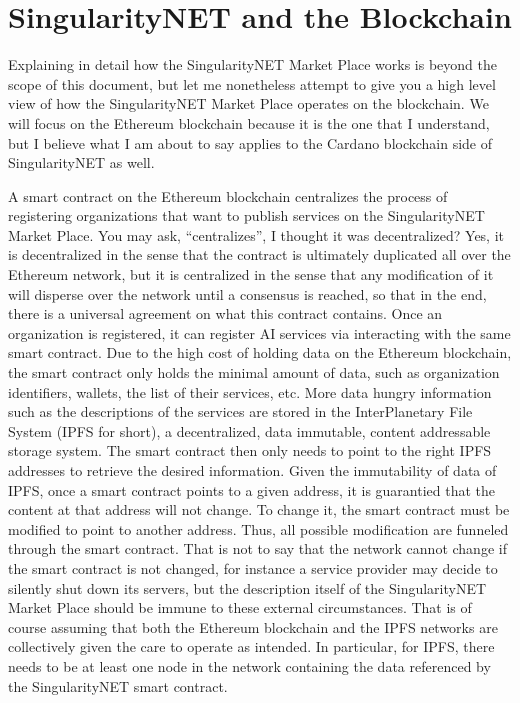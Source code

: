 \documentclass[]{report}
\begin{document}
\section{SingularityNET and the Blockchain}
Explaining in detail how the SingularityNET Market Place works is
beyond the scope of this document, but let me nonetheless attempt to
give you a high level view of how the SingularityNET Market Place
operates on the blockchain.  We will focus on the Ethereum blockchain
because it is the one that I understand, but I believe what I am about
to say applies to the Cardano blockchain side of SingularityNET as
well.

A smart contract on the Ethereum blockchain centralizes the process of
registering organizations that want to publish services on the
SingularityNET Market Place.  You may ask, ``centralizes'', I thought
it was decentralized?  Yes, it is decentralized in the sense that the
contract is ultimately duplicated all over the Ethereum network, but
it is centralized in the sense that any modification of it will
disperse over the network until a consensus is reached, so that in the
end, there is a universal agreement on what this contract contains.
Once an organization is registered, it can register AI services via
interacting with the same smart contract.  Due to the high cost of
holding data on the Ethereum blockchain, the smart contract only holds
the minimal amount of data, such as organization identifiers, wallets,
the list of their services, etc.  More data hungry information such as
the descriptions of the services are stored in the InterPlanetary File
System (IPFS for short), a decentralized, data immutable, content
addressable storage system.  The smart contract then only needs to
point to the right IPFS addresses to retrieve the desired information.
Given the immutability of data of IPFS, once a smart contract points
to a given address, it is guarantied that the content at that address
will not change.  To change it, the smart contract must be modified to
point to another address.  Thus, all possible modification are
funneled through the smart contract.  That is not to say that the
network cannot change if the smart contract is not changed, for
instance a service provider may decide to silently shut down its
servers, but the description itself of the SingularityNET Market Place
should be immune to these external circumstances.  That is of course
assuming that both the Ethereum blockchain and the IPFS networks are
collectively given the care to operate as intended.  In particular,
for IPFS, there needs to be at least one node in the network
containing the data referenced by the SingularityNET smart contract.
\end{document}
